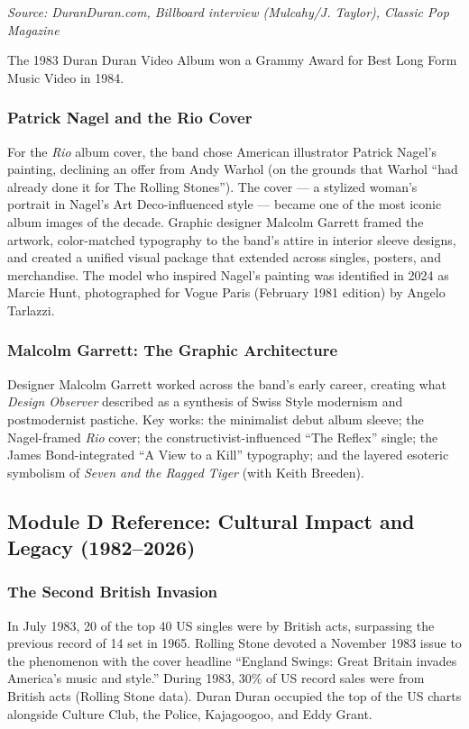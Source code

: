 \documentclass[11pt,letterpaper]{article}
\begin{document}
\textit{Source: DuranDuran.com, Billboard interview (Mulcahy/J. Taylor), Classic Pop Magazine}

The 1983 Duran Duran Video Album won a Grammy Award for Best Long Form Music Video in 1984.

\subsubsection{Patrick Nagel and the Rio Cover}

For the \textit{Rio} album cover, the band chose American illustrator Patrick Nagel's painting, declining an offer from Andy Warhol (on the grounds that Warhol ``had already done it for The Rolling Stones''). The cover --- a stylized woman's portrait in Nagel's Art Deco-influenced style --- became one of the most iconic album images of the decade. Graphic designer Malcolm Garrett framed the artwork, color-matched typography to the band's attire in interior sleeve designs, and created a unified visual package that extended across singles, posters, and merchandise. The model who inspired Nagel's painting was identified in 2024 as Marcie Hunt, photographed for Vogue Paris (February 1981 edition) by Angelo Tarlazzi.

\subsubsection{Malcolm Garrett: The Graphic Architecture}

Designer Malcolm Garrett worked across the band's early career, creating what \textit{Design Observer} described as a synthesis of Swiss Style modernism and postmodernist pastiche. Key works: the minimalist debut album sleeve; the Nagel-framed \textit{Rio} cover; the constructivist-influenced ``The Reflex'' single; the James Bond-integrated ``A View to a Kill'' typography; and the layered esoteric symbolism of \textit{Seven and the Ragged Tiger} (with Keith Breeden).

\subsection{Module D Reference: Cultural Impact and Legacy (1982--2026)}

\subsubsection{The Second British Invasion}

In July 1983, 20 of the top 40 US singles were by British acts, surpassing the previous record of 14 set in 1965. Rolling Stone devoted a November 1983 issue to the phenomenon with the cover headline ``England Swings: Great Britain invades America's music and style.'' During 1983, 30\% of US record sales were from British acts (Rolling Stone data). Duran Duran occupied the top of the US charts alongside Culture Club, the Police, Kajagoogoo, and Eddy Grant.
\end{document}
